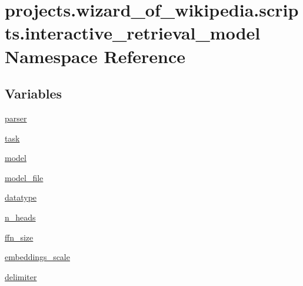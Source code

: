 \hypertarget{namespaceprojects_1_1wizard__of__wikipedia_1_1scripts_1_1interactive__retrieval__model}{}\section{projects.\+wizard\+\_\+of\+\_\+wikipedia.\+scripts.\+interactive\+\_\+retrieval\+\_\+model Namespace Reference}
\label{namespaceprojects_1_1wizard__of__wikipedia_1_1scripts_1_1interactive__retrieval__model}
\subsection*{Variables}
\begin{DoxyCompactItemize}
\item 
\hyperlink{namespaceprojects_1_1wizard__of__wikipedia_1_1scripts_1_1interactive__retrieval__model_af0ec369ed828df31d66ae8f6a6cc017e}{parser}
\item 
\hyperlink{namespaceprojects_1_1wizard__of__wikipedia_1_1scripts_1_1interactive__retrieval__model_af71f14598479c047dc908c7f7f26d5db}{task}
\item 
\hyperlink{namespaceprojects_1_1wizard__of__wikipedia_1_1scripts_1_1interactive__retrieval__model_aa65c5018f3942dc1f3c0c1776d1248d5}{model}
\item 
\hyperlink{namespaceprojects_1_1wizard__of__wikipedia_1_1scripts_1_1interactive__retrieval__model_a16a7551d118a5f8848b6293f524c3b52}{model\+\_\+file}
\item 
\hyperlink{namespaceprojects_1_1wizard__of__wikipedia_1_1scripts_1_1interactive__retrieval__model_ae707f336fd450f48afc6bda565ad8623}{datatype}
\item 
\hyperlink{namespaceprojects_1_1wizard__of__wikipedia_1_1scripts_1_1interactive__retrieval__model_af748b2e21f8ed91d73ed8bbfc4c77c8f}{n\+\_\+heads}
\item 
\hyperlink{namespaceprojects_1_1wizard__of__wikipedia_1_1scripts_1_1interactive__retrieval__model_ab1b1176973bd6c298a26e7ca656cac90}{ffn\+\_\+size}
\item 
\hyperlink{namespaceprojects_1_1wizard__of__wikipedia_1_1scripts_1_1interactive__retrieval__model_a74e9d3092d9627c472d09e459a460194}{embeddings\+\_\+scale}
\item 
\hyperlink{namespaceprojects_1_1wizard__of__wikipedia_1_1scripts_1_1interactive__retrieval__model_afd85b9d92c10ec2d2ff7c59494235640}{delimiter}

\end{DoxyCompactItemize}
